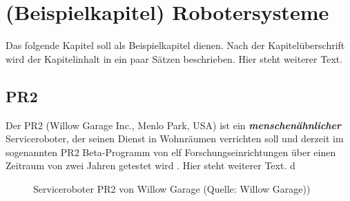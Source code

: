 \chapter{(Beispielkapitel) Robotersysteme}

Das folgende Kapitel soll als Beispielkapitel dienen. Nach der Kapitelüberschrift wird der Kapitelinhalt in ein paar Sätzen beschrieben.
Hier steht weiterer Text.

\section{PR2}

Der PR2 (Willow Garage Inc., Menlo Park, USA) ist ein \textbf{\textit{menschenähnlicher}} Serviceroboter, der seinen Dienst in Wohnräumen verrichten soll und derzeit im sogenannten PR2 Beta-Programm von elf Forschungseinrichtungen über einen Zeitraum von zwei Jahren getestet wird 
\cite{WillowGarage2010}.
Hier steht weiterer Text.  d

\begin{figure}[!ht]
	\centering
	\subfigure[]{\texttt{[image: PR2-1]}}
	\hspace{5mm}
	\subfigure[]{\texttt{[image: PR2-2]}}
	\hspace{5mm}
	\subfigure[]{\texttt{[image: PR2-3]}}
	\caption{Serviceroboter PR2 von Willow Garage (Quelle: Willow Garage))}
	\label{fig.PR2}
\end{figure}

